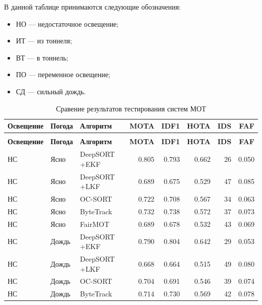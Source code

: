 В данной таблице принимаются следующие обозначения:

\begin{itemize}
       \item НО --- недостаточное освещение;
       \item ИТ --- из тоннеля;
       \item ВТ --- в тоннель;
       \item ПО --- переменное освещение;
       \item СД --- сильный дождь.
\end{itemize}

\begin{longtable}{|p{2.42cm}|p{1.8cm}|p{2.4cm}|r|r|r|r|r|}
\caption{Сравение результатов тестирования систем МОТ}
\label{tab::mot_video_results}\\ \hline
\textbf{Освещение} & \textbf{Погода} & \textbf{Алгоритм} & \textbf{MOTA} & \textbf{IDF1} & \textbf{HOTA} &\textbf{IDS} & \textbf{FAF} \\  \hline
\endfirsthead
\caption*{Сравение результатов тестирования систем МОТ} \\ \hline
\textbf{Освещение} & \textbf{Погода} & \textbf{Алгоритм} & \textbf{MOTA} & \textbf{IDF1} & \textbf{HOTA} &\textbf{IDS} & \textbf{FAF} \\ \hline
\endhead
\hline
\endfoot
\hline
\endlastfoot
       НС     &      Ясно & DeepSORT +EKF & 0.805 & 0.793 & 0.662 &   26 & 0.050        \\ \hline
       НС     &      Ясно & DeepSORT +LKF & 0.689 & 0.675 & 0.529 &   47 & 0.085        \\ \hline
       НС     &      Ясно &      OC-SORT & 0.722 & 0.708 & 0.567 &   34 & 0.063         \\ \hline
       НС     &      Ясно &    ByteTrack & 0.732 & 0.738 & 0.572 &   37 & 0.073         \\ \hline
       НС     &      Ясно &      FairMOT & 0.689 & 0.678 & 0.532 &   43 & 0.069         \\ \hline
       НС     &      Дождь & DeepSORT +EKF & 0.790 & 0.804 & 0.642 &   29 & 0.053      \\ \hline
       НС     &      Дождь & DeepSORT +LKF & 0.668 & 0.664 & 0.515 &   49 & 0.080      \\ \hline
       НС     &      Дождь &      OC-SORT & 0.704 & 0.691 & 0.546 &   39 & 0.074       \\ \hline
       НС     &      Дождь &    ByteTrack & 0.714 & 0.730 & 0.569 &   42 & 0.078       \\ \hline

\end{longtable}
